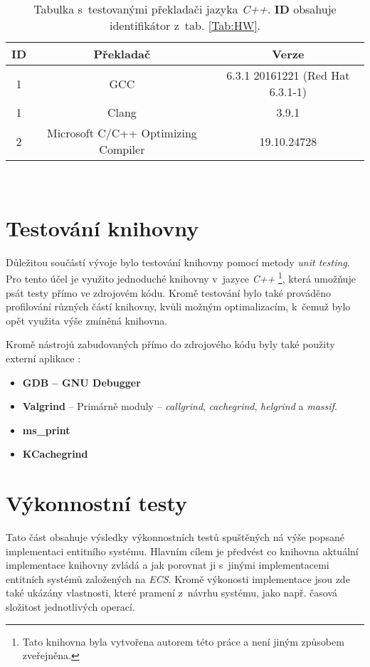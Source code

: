 \begin{table}[H]
	\begin{center}
		\begin{tabular}{| c | c | c |}
			\hline
			\textbf{ID} & \textbf{Překladač} & \textbf{Verze} \\
			\hline
			1 & GCC & 6.3.1 20161221 (Red Hat 6.3.1-1) \\
			\hline
			1 & Clang & 3.9.1 \\
			\hline
			2 & Microsoft C/C++ Optimizing Compiler & 19.10.24728 \\
			\hline
		\end{tabular}\\[1em]
		\caption{Tabulka s~testovanými překladači jazyka \emph{C++}. \textbf{ID} obsahuje identifikátor z~tab. \ref{Tab:HW}.}
		\label{Tab:Compiler}
	\end{center}
\end{table}

\section{Testování knihovny}

Důležitou součástí vývoje bylo testování knihovny pomocí metody \emph{unit testing}. Pro tento účel je využito jednoduché knihovny v~jazyce \emph{C++} \footnote{Tato knihovna byla vytvořena autorem této práce a není jiným způsobem zveřejněna.}, která umožňuje psát testy přímo ve zdrojovém kódu. Kromě testování bylo také prováděno profilování různých částí knihovny, kvůli možným optimalizacím, k~čemuž bylo opět využita výše zmíněná knihovna. 

Kromě nástrojů zabudovaných přímo do zdrojového kódu byly také použity externí aplikace : 
\begin{itemize}
	\item \textbf{GDB -- GNU Debugger}
	\item \textbf{Valgrind} -- Primárně moduly -- \emph{callgrind}, \emph{cachegrind}, \emph{helgrind} a \emph{massif}.
	\item \textbf{ms\_print}
	\item \textbf{KCachegrind}
\end{itemize}

\section{Výkonnostní testy}

Tato část obsahuje výsledky výkonnostních testů spuštěných ná výše popsané implementaci entitního systému. Hlavním cílem je předvést co knihovna aktuální implementace knihovny zvládá a jak porovnat ji s~jinými implementacemi entitních systémů založených na \emph{ECS}. Kromě výkonosti implementace jsou zde také ukázány vlastnosti, které pramení z~návrhu systému, jako např. časová složitost jednotlivých operací.

